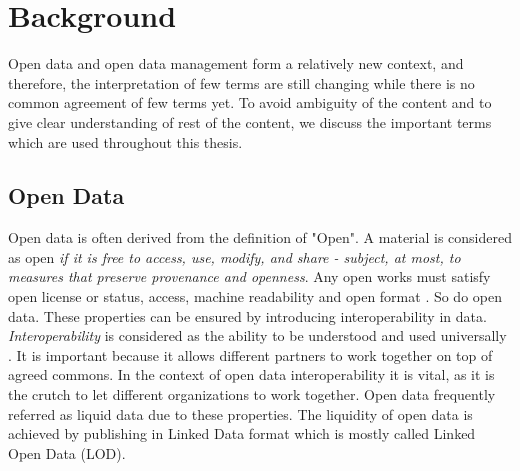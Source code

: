 \section{Background}
\noindent Open data and open data management form a relatively new context, and therefore, the interpretation of few terms are still changing while there is no common agreement of few terms yet.  To avoid ambiguity of the content and to give clear understanding of rest of the content, we discuss the important terms which are used throughout this thesis. 
\subsection{Open Data}
\noindent Open data is often derived from the definition of "Open". A material is considered as open \textit{if it is free to access, use, modify, and share - subject, at most, to measures that preserve provenance and openness}. Any open works must satisfy open license or status, access, machine readability and open format \cite{opendefinition}. So do open data. These properties can be ensured by introducing  interoperability in data. \textit{Interoperability} is considered as the ability to be understood and used universally \cite{opendatahandbook}. It is important because it allows different partners to work together on top of agreed commons. In the context of open data interoperability it is vital, as it is the crutch to let different organizations to work together. Open data frequently referred as liquid data due to these properties. The liquidity of open data is achieved by publishing in Linked Data format which is mostly called Linked Open Data (LOD). 


